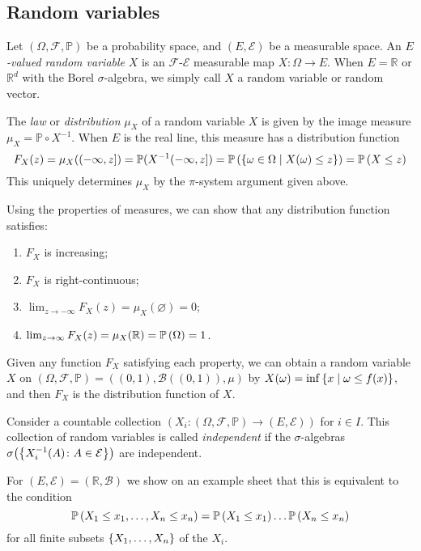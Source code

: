 \subsection{Random variables}
\begin{definition}
	Let \( (\Omega, \mathcal F, \mathbb P) \) be a probability space, and \( (E, \mathcal E) \) be a measurable space.
	An \emph{\( E \)-valued random variable} \( X \) is an \( \mathcal F \)-\( \mathcal E \) measurable map \( X \colon \Omega \to E \).
	When \( E = \mathbb R \) or \( \mathbb R^d \) with the Borel \( \sigma \)-algebra, we simply call \( X \) a random variable or random vector.

	The \emph{law} or \emph{distribution} \( \mu_X \) of a random variable \( X \) is given by the image measure \( \mu_X = \mathbb P \circ X^{-1} \).
	When \( E \) is the real line, this measure has a distribution function
	\[ F_X(z) = \mu_X((-\infty, z]) = \mathbb P(X^{-1}(-\infty,z]) = \mathbb{P}\left({\qty{\omega \in \Omega \mid X(\omega) \leq z}}\right) = \mathbb{P}\left({X \leq z}\right) \]
	This uniquely determines \( \mu_X \) by the \( \pi \)-system argument given above.
\end{definition}
Using the properties of measures, we can show that any distribution function satisfies:
\begin{enumerate}
	\item \( F_X \) is increasing;
	\item \( F_X \) is right-continuous;
	\item \( \lim_{z \to -\infty} F_X(z) = \mu_X(\varnothing) = 0 \);
	\item \( \lim_{z \to \infty} F_X(z) = \mu_X(\mathbb R) = \mathbb{P}\left({\Omega}\right) = 1 \).
\end{enumerate}
Given any function \( F_X \) satisfying each property, we can obtain a random variable \( X \) on \( (\Omega, \mathcal F, \mathbb P) = ((0,1), \mathcal B((0,1)), \mu) \) by \( X(\omega) = \inf\qty{x \mid \omega \leq f(x)} \), and then \( F_X \) is the distribution function of \( X \).
\begin{definition}
	Consider a countable collection \( (X_i \colon (\Omega, \mathcal F, \mathbb P) \to (E, \mathcal E)) \) for \( i \in I \).
	This collection of random variables is called \emph{independent} if the \( \sigma \)-algebras \( \sigma\qty(\qty{X_i^{-1}(A) \colon A \in \mathcal E}) \) are independent.
\end{definition}
For \( (E, \mathcal E) = (\mathbb R, \mathcal B) \) we show on an example sheet that this is equivalent to the condition
\[ \mathbb{P}\left({X_1 \leq x_1, \dots, X_n \leq x_n}\right) = \mathbb{P}\left({X_1 \leq x_1}\right) \dots \mathbb{P}\left({X_n \leq x_n}\right) \]
for all finite subsets \( \qty{X_1, \dots, X_n} \) of the \( X_i \).

